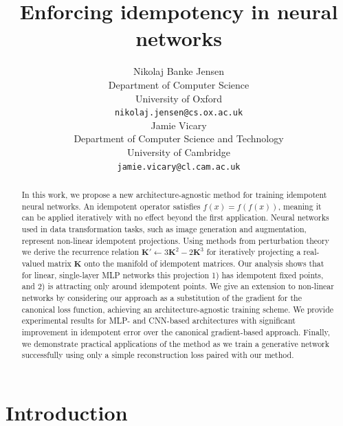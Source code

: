 \documentclass{article}
\title{Enforcing idempotency in neural networks}
\author{%
  Nikolaj Banke Jensen \\ %
  Department of Computer Science\\
  University of Oxford\\
  \texttt{nikolaj.jensen@cs.ox.ac.uk} \\
  \And
  Jamie Vicary \\
  Department of Computer Science and Technology \\
  University of Cambridge \\
  \texttt{jamie.vicary@cl.cam.ac.uk} \\
}
\begin{document}
\maketitle


\begin{abstract}
  In this work, we propose a new architecture-agnostic method for training idempotent neural networks. An idempotent operator satisfies $f(x) = f(f(x))$, meaning it can be applied iteratively with no effect beyond the first application. Neural networks used in data transformation tasks, such as image generation and augmentation, represent non-linear idempotent projections. Using methods from perturbation theory we derive the recurrence relation ${\mathbf{K}' \leftarrow 3\mathbf{K}^2 - 2\mathbf{K}^3}$ for iteratively projecting a real-valued matrix $\mathbf{K}$ onto the manifold of idempotent matrices. Our analysis shows that for linear, single-layer MLP networks this projection 1) has idempotent fixed points, and 2) is attracting only around idempotent points. We give an extension to non-linear networks by considering our approach as a substitution of the gradient for the canonical loss function, achieving an architecture-agnostic training scheme. We provide experimental results for MLP- and CNN-based architectures with significant improvement in idempotent error over the canonical gradient-based approach. Finally, we demonstrate practical applications of the method as we train a generative network successfully using only a simple reconstruction loss paired with our method.
\end{abstract}

\section{Introduction}
\label{sec:intro}
\end{document}
